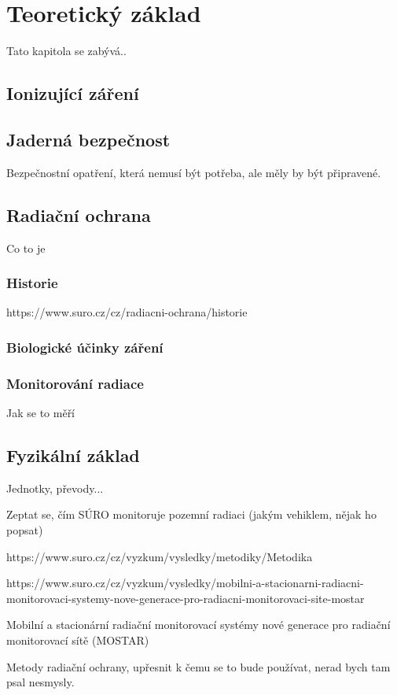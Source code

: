 \chapter{Teoretický základ}
\label{2-teorie}

Tato kapitola se zabývá..
\section{Ionizující záření}

\section{Jaderná bezpečnost}
Bezpečnostní opatření, která nemusí být potřeba, ale měly by být připravené.

\section{Radiační ochrana}
Co to je
\subsection{Historie}
https://www.suro.cz/cz/radiacni-ochrana/historie
\subsection{Biologické účinky záření}

\subsection{Monitorování radiace}
Jak se to měří

\section{Fyzikální základ}

Jednotky, převody...







Zeptat se, čím SÚRO monitoruje pozemní radiaci (jakým vehiklem, nějak ho popsat)

https://www.suro.cz/cz/vyzkum/vysledky/metodiky/Metodika%

https://www.suro.cz/cz/vyzkum/vysledky/mobilni-a-stacionarni-radiacni-monitorovaci-systemy-nove-generace-pro-radiacni-monitorovaci-site-mostar

Mobilní a stacionární radiační monitorovací systémy nové generace pro radiační monitorovací sítě (MOSTAR)

Metody radiační ochrany, upřesnit k čemu se to bude používat, nerad bych tam psal nesmysly.